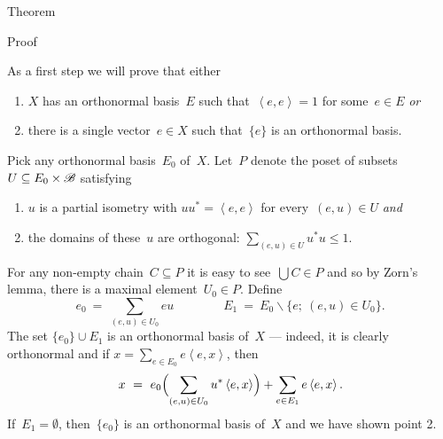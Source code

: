 \documentclass[b]{subfiles}
\begin{document}
\begin{parsec}
\begin{point}{Theorem}
\begin{point}{Proof}
\begin{point}
As a first step we will prove that
either
\begin{enumerate}
\item $X$ has an orthonormal basis~$E$
    such that~$\left<e,e\right>=1$ for some~$e \in E$ \emph{or}
\item there is a single vector~$e \in X$ such that~$\{e\}$ is an orthonormal basis.
\end{enumerate}
Pick any orthonormal basis~$E_0$ of~$X$.
Let~$P$ denote the poset of subsets~$U \subseteq E_0 \times \mathscr{B}$
    satisfying
\begin{enumerate}
    \item
    $u$ is a partial isometry with $uu^* = \left<e,e\right>$
        for every~$(e,u) \in U$ \emph{and}
    \item
    the domains of these~$u$ are orthogonal:  $\sum_{(e,u) \in U} u^*u \leq 1$.
\end{enumerate}
For any non-empty chain~$C \subseteq P$
    it is easy to see~$\bigcup C \in P$
    and so by Zorn's lemma,
    there is a maximal element~$U_0 \in P$.
Define
\begin{equation*}
e_0 \ =\  \sum_{(e,u) \in U_0} eu
    \qquad \qquad E_1 \ = \ E_0 \backslash \{e;\ (e,u) \in U_0\}.
\end{equation*}
The set $\{e_0\} \cup E_1$ is an orthonormal basis of~$X$
    --- indeed, it is clearly orthonormal and
    if $x = \sum_{e \in E_0} e \left<e,x\right>$,
    then
\begin{equation*}
    x \ =\  e_0 \Bigl(\sum_{(e,u) \in U_0} u^*\left<e,x\right>\Bigr)
            + \sum_{e \in E_1} e\left<e,x\right>.
\end{equation*}
If~$E_1 = \emptyset$, then~$\{e_0\}$ is an orthonormal basis of~$X$ and
    we have shown point 2.


\end{point}
\end{point}
\end{point}
\end{parsec}
\end{document}
